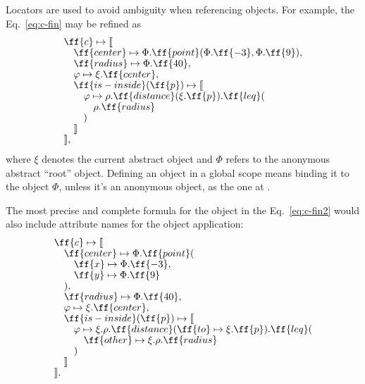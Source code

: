 Locators are used to avoid ambiguity when referencing objects.
For example, the Eq.~\ref{eq:c-fin} may be refined as
\begin{equation}
\begin{split}
& \ff{c} \mapsto \llbracket \br
& \quad \ff{center} \mapsto \Phi.\ff{point}(\Phi.\ff{-3}, \Phi.\ff{9}), \br
& \quad \ff{radius} \mapsto \Phi.\ff{40}, \br
& \quad \varphi \mapsto \xi.\ff{center}, \br
& \quad \ff{is-inside}(\ff{p}) \mapsto \llbracket \br
& \quad \quad \varphi \mapsto \rho.\ff{distance}(\xi.\ff{p}).\ff{leq}( \br
& \quad \quad \quad \rho.\ff{radius} \br
& \quad \quad ) \br
& \quad \rrbracket \br
& \rrbracket,
\end{split}
\end{equation}
where $\xi$ denotes the current abstract object
and $\Phi$ refers to the anonymous abstract ``root'' object.
Defining an object in a global scope
means binding it to the object $\Phi$, unless it's an anonymous
object, as the one at .

The most precise and complete formula for the object in the
Eq.~\ref{eq:c-fin2} would also include attribute names for
the object application:
\begin{equation}
\begin{split}
& \ff{c} \mapsto \llbracket \br
& \quad \ff{center} \mapsto \Phi.\ff{point}( \br
& \quad \quad \ff{x} \mapsto \Phi.\ff{-3}, \br
& \quad \quad \ff{y} \mapsto \Phi.\ff{9} \br
& \quad ), \br
& \quad \ff{radius} \mapsto \Phi.\ff{40}, \br
& \quad \varphi \mapsto \xi.\ff{center}, \br
& \quad \ff{is-inside}(\ff{p}) \mapsto \llbracket \br
& \quad \quad \varphi \mapsto \xi.\rho.\ff{distance}(\ff{to} \mapsto \xi.\ff{p}).\ff{leq}( \br
& \quad \quad \quad \ff{other} \mapsto \xi.\rho.\ff{radius} \br
& \quad \quad ) \br
& \quad \rrbracket \br
& \rrbracket.
\end{split}
\end{equation}



